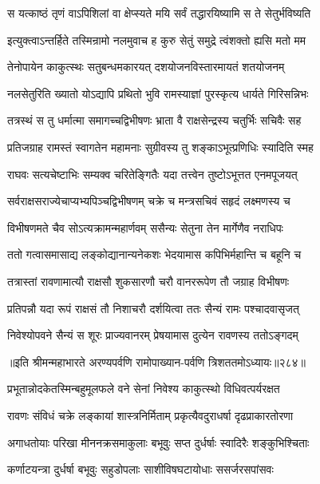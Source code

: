 \twolineshloka
{स यत्काष्ठं तृणं वाऽपिशिलां वा क्षेप्स्यते मयि}
{सर्वं तद्धारयिष्यामि स ते सेतुर्भविष्यति}


\twolineshloka
{इत्युक्त्वाऽन्तर्हिते तस्मिन्रामो नलमुवाच ह}
{कुरु सेतुं समुद्रे त्वंशक्तो ह्यसि मतो मम}


\twolineshloka
{तेनोपायेन काकुत्स्थः सतुबन्धमकारयत्}
{दशयोजनविस्तारमायतं शतयोजनम्}


\twolineshloka
{नलसेतुरिति ख्यातो योऽद्यापि प्रथितो भुवि}
{रामस्याज्ञां पुरस्कृत्य धार्यते गिरिसन्निभः}


\twolineshloka
{तत्रस्थं स तु धर्मात्मा समागच्चद्विभीषणः}
{भ्राता वै राक्षसेन्द्रस्य चतुर्भिः सचिवैः सह}


\twolineshloka
{प्रतिजग्राह रामस्तं स्वागतेन महामनाः}
{सुग्रीवस्य तु शङ्काऽभूत्प्रणिधिः स्यादिति स्मह}


\twolineshloka
{राघवः सत्यचेष्टाभिः सम्यक्व चरितेङ्गितैः}
{यदा तत्त्वेन तुष्टोऽभूत्तत एनमपूजयत्}


\twolineshloka
{सर्वराक्षसराज्येचाप्यभ्यपिञ्चद्विभीषणम्}
{चक्रे च मन्त्रसचिवं सहृदं लक्ष्मणस्य च}


\twolineshloka
{विभीषणमते चैव सोऽत्यक्रामन्महार्णवम्}
{ससैन्यः सेतुना तेन मार्गेणैव नराधिपः}


\twolineshloka
{ततो गत्वासमासाद्य लङ्कोद्यानान्यनेकशः}
{भेदयामास कपिभिर्महान्ति च बहूनि च}


\twolineshloka
{तत्रास्तां रावणामात्यौ राक्षसौ शुकसारणौ}
{चरौ वानररूपेण तौ जग्राह विभीषणः}


\twolineshloka
{प्रतिपन्नौ यदा रूपं राक्षसं तौ निशाचरौ}
{दर्शयित्वा ततः सैन्यं रामः पश्चादवासृजत्}


\twolineshloka
{निवेश्योपवने सैन्यं स शूरः प्राज्यवानरम्}
{प्रेषयामास दुत्येन रावणस्य ततोऽङ्गदम्}


॥इति श्रीमन्महाभारते अरण्यपर्वणि रामोपाख्यान-पर्वणि त्रिशततमोऽध्यायः॥२८४॥




\twolineshloka
{प्रभूतान्नोदकेतस्मिन्बहुमूलफले वने}
{सेनां निवेश्य काकुत्स्थो विधिवत्पर्यरक्षत}


\twolineshloka
{रावणः संविधं चक्रे लङ्कायां शास्त्रनिर्मिताम्}
{प्रकृत्यैवदुराधर्षा दृढप्राकारतोरणा}


\twolineshloka
{अगाधतोयाः परिखा मीननक्रसमाकुलाः}
{बभूवुः सप्त दुर्धर्षाः स्वादिरैः शङ्कुभिश्चिताः}


\twolineshloka
{कर्णाटयन्त्रा दुर्धर्षा बभूवुः सहुडोपलाः}
{साशीविषघटायोधाः ससर्जरसपांसवः}


